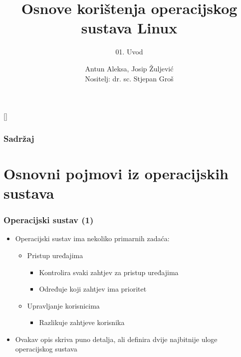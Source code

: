 \documentclass{beamer}
\title{Osnove korištenja operacijskog sustava Linux}
\subtitle{01. Uvod}
\author[Antun Aleksa, Josip Žuljević]{Antun Aleksa, Josip Žuljević\\{\small Nositelj: dr. sc. Stjepan Groš}}
\institute[FER]{Sveučilište u Zagrebu \\
				Fakultet elektrotehnike i računarstva}
\date{\todayiso}
\begin{document}
{
[] %

\begin{frame}
\maketitle
\end{frame}
}

\begin{frame}
\frametitle{Sadržaj}
\tableofcontents
\end{frame}

\section{Osnovni pojmovi iz operacijskih sustava}
\begin{frame}[t]
\frametitle{Operacijski sustav (1)}
\begin{itemize}
	\item Operacijski sustav ima nekoliko primarnih zadaća:
  \begin{itemize}
    \item Pristup uređajima
    \begin{itemize}
      \item Kontrolira svaki zahtjev za pristup uređajima
      \item Određuje koji zahtjev ima prioritet
    \end{itemize}
    \item Upravljanje korisnicima
    \begin{itemize}
      \item Razlikuje zahtjeve korisnika
    \end{itemize}
	\end{itemize}
  \item Ovakav opis skriva puno detalja, ali definira dvije najbitnije uloge
        operacijskog sustava 
\end{itemize}
\end{frame}
\end{document}
